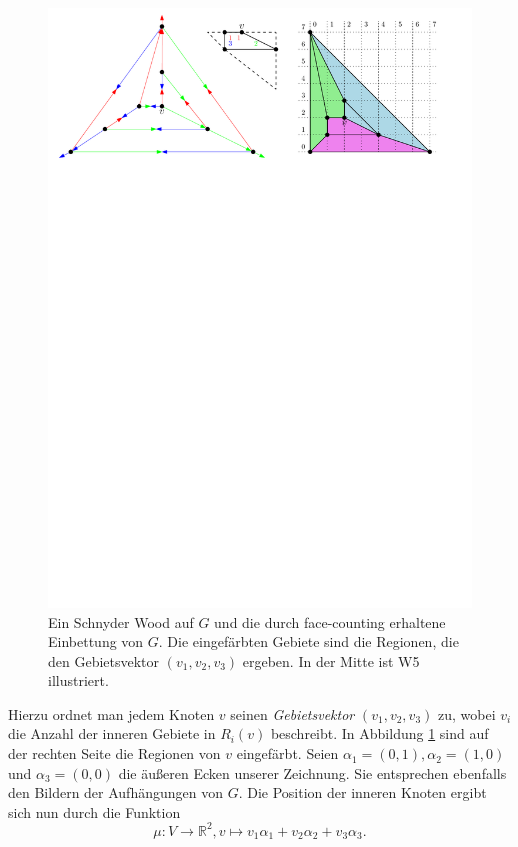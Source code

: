 \begin{figure}
	\centering
  \includegraphics[width=1\textwidth]{face_counting.pdf}
	\caption{Ein Schnyder Wood auf $G$ und die durch face-counting erhaltene Einbettung von $G$. Die eingefärbten Gebiete sind die Regionen, die den Gebietsvektor $(v_1,v_2,v_3)$ ergeben. In der Mitte ist W5 illustriert.}
	\label{face_counting}
\end{figure}

Hierzu ordnet man jedem Knoten $v$ seinen \textit{Gebietsvektor} $(v_1,v_2,v_3)$ zu, wobei $v_i$ die Anzahl der inneren Gebiete in $R_i(v)$ beschreibt. In Abbildung \ref{face_counting} sind auf der rechten Seite die Regionen von $v$ eingefärbt. Seien $\alpha_1 = (0,1),\alpha_2 = (1,0)$ und $\alpha_3 = (0,0)$ die äußeren Ecken unserer Zeichnung. Sie entsprechen ebenfalls den Bildern der Aufhängungen von $G$. Die Position der inneren Knoten ergibt sich nun durch die Funktion 
$$\mu: V \to \mathbb{R}^2,v\mapsto v_1\alpha_1 + v_2\alpha_2+v_3\alpha_3.$$ 

